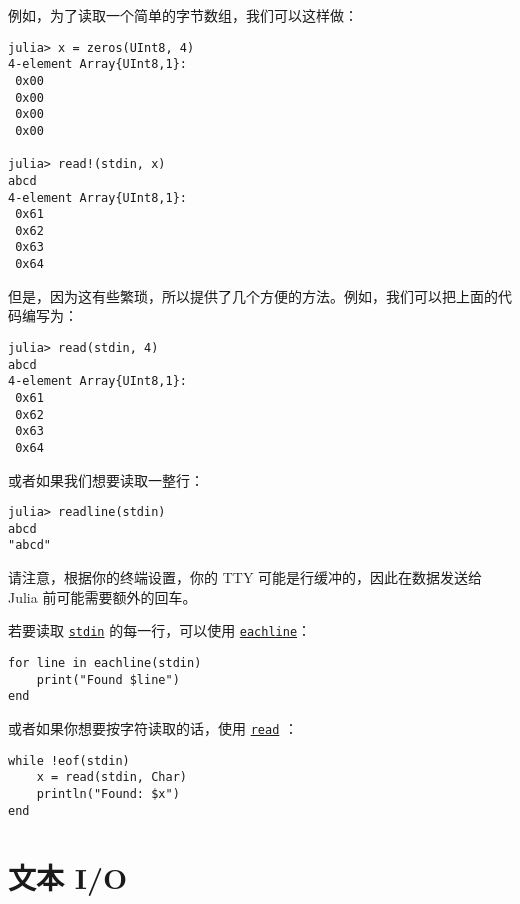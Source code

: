 例如，为了读取一个简单的字节数组，我们可以这样做：




\begin{verbatim}
julia> x = zeros(UInt8, 4)
4-element Array{UInt8,1}:
 0x00
 0x00
 0x00
 0x00

julia> read!(stdin, x)
abcd
4-element Array{UInt8,1}:
 0x61
 0x62
 0x63
 0x64
\end{verbatim}



但是，因为这有些繁琐，所以提供了几个方便的方法。例如，我们可以把上面的代码编写为：




\begin{verbatim}
julia> read(stdin, 4)
abcd
4-element Array{UInt8,1}:
 0x61
 0x62
 0x63
 0x64
\end{verbatim}



或者如果我们想要读取一整行：




\begin{verbatim}
julia> readline(stdin)
abcd
"abcd"
\end{verbatim}



请注意，根据你的终端设置，你的 TTY 可能是行缓冲的，因此在数据发送给 Julia 前可能需要额外的回车。



若要读取 \hyperlink{3330957653919693521}{\texttt{stdin}} 的每一行，可以使用 \hyperlink{3474649815265066504}{\texttt{eachline}}：




\begin{verbatim}
for line in eachline(stdin)
    print("Found $line")
end
\end{verbatim}



或者如果你想要按字符读取的话，使用 \hyperlink{8104134490906192097}{\texttt{read}} ：




\begin{verbatim}
while !eof(stdin)
    x = read(stdin, Char)
    println("Found: $x")
end
\end{verbatim}



\hypertarget{14803809014545196748}{}


\section{文本 I/O}



